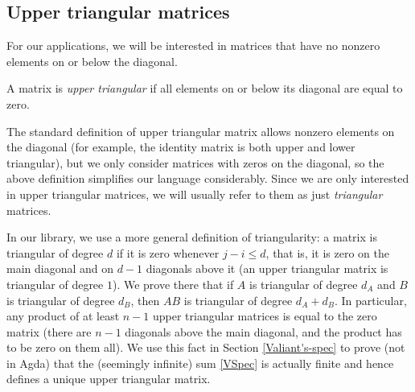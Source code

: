 \subsection{Upper triangular matrices}
\label{Triangular-matrices}
For our applications, we will be interested in matrices that have no nonzero elements on or below the diagonal.
\begin{Definition}
  A matrix is \emph{upper triangular} if all elements on or below its diagonal are equal to zero.
\end{Definition}
The standard definition of upper triangular matrix allows nonzero elements on the diagonal (for example, the identity matrix is both upper and lower triangular), but we only consider matrices with zeros on the diagonal, so the above definition simplifies our language considerably.
Since we are only interested in upper triangular matrices, we will usually refer to them as just \emph{triangular} matrices.

In our library, we use a more general definition of triangularity: a matrix is triangular of degree $d$ if it is zero whenever $j - i \le d$, that is, it is zero on the main diagonal and on $d - 1$ diagonals above it (an upper triangular matrix is triangular of degree $1$). We prove there that if $A$ is triangular of degree $d_A$ and $B$ is triangular of degree $d_B$, then $AB$ is triangular of degree $d_A + d_B$. In particular, any product of at least $n-1$ upper triangular matrices is equal to the zero matrix (there are $n-1$ diagonals above the main diagonal, and the product has to be zero on them all). We use this fact in Section \ref{Valiant's-spec} to prove (not in Agda) that the (seemingly infinite) sum \eqref{VSpec} is actually finite and hence defines a unique upper triangular matrix.
